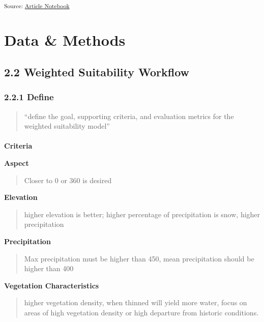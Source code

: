 \documentclass[
]{agujournal2019}
\makeatletter
\let\oldparagraph\paragraph
\renewcommand{\paragraph}{
    \@ifstar
      \xxxParagraphStar
      \xxxParagraphNoStar
  }
\newcommand{\xxxParagraphStar}[1]{\oldparagraph*{#1}\mbox{}}
\newcommand{\xxxParagraphNoStar}[1]{\oldparagraph{#1}\mbox{}}
\makeatother
\begin{document}
\textsubscript{Source:
\href{https://Ryan3Lima.github.io/ATUR-ForestThinning/index.ipynb.html}{Article
Notebook}}

\section{Data \& Methods}\label{sec-data-methods}

\subsection{2.2 Weighted Suitability
Workflow}\label{weighted-suitability-workflow}

\subsubsection{2.2.1 Define}\label{define}

\begin{quote}
``define the goal, supporting criteria, and evaluation metrics for the
weighted suitability model''
\end{quote}

\paragraph{\texorpdfstring{\textbf{Criteria}}{Criteria}}\label{criteria}

\textbf{Aspect}

\begin{quote}
Closer to 0 or 360 is desired
\end{quote}

\textbf{Elevation}

\begin{quote}
higher elevation is better; higher percentage of precipitation is snow,
higher precipitation
\end{quote}

\textbf{Precipitation}

\begin{quote}
Max precipitation must be higher than 450, mean precipitation should be
higher than 400
\end{quote}

\textbf{Vegetation Characteristics}

\begin{quote}
higher vegetation density, when thinned will yield more water, focus on
areas of high vegetation density or high departure from historic
conditions.
\end{quote}
\end{document}
